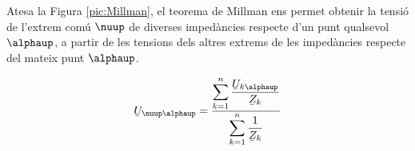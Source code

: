 Atesa la Figura \vref{pic:Millman}, el teorema
de Millman ens permet
obtenir la tensió de l'extrem comú $\nuup$ de diverses impedàncies respecte d'un punt
qualsevol $\alphaup$, a partir de les tensions dels altres extrems de les impedàncies respecte  del mateix punt $\alphaup$.

\hfill
\begin{minipage}[b]{7cm}
    
    \label{pic:Millman}
\end{minipage}
\hfill
\begin{minipage}[b][4.5cm][t]{6cm}
    \begin{equation}
        \cmplx{U}_{\nuup\alphaup} = \frac{\displaystyle\sum_{k=1}^n \dfrac{\cmplx{U}_{k\alphaup}}{\cmplx{Z}_k}} {\displaystyle\sum_{k=1}^n \dfrac{1}{\cmplx{Z}_k}}
        \label{eq:millman}
    \end{equation}
\end{minipage}


\pagebreak

